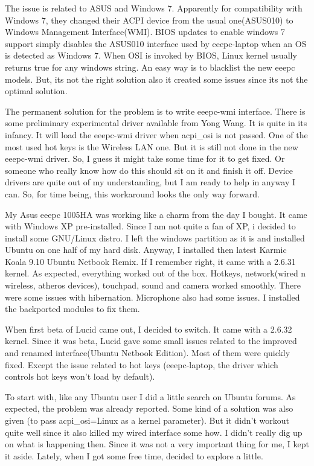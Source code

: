 The issue is related to ASUS and Windows 7. Apparently for compatibility 
with Windows 7, they changed their ACPI device from the usual one(ASUS010)
to Windows Management Interface(WMI). BIOS updates to enable windows 7 
support simply disables the ASUS010 interface used by eeepc-laptop when an 
OS is detected as Windows 7. When OSI is invoked by BIOS, Linux kernel usually
returns true for any windows string. An easy way is to blacklist the new eeepc
models. But, its not the right solution also it created some issues since its not the optimal solution.

The permanent solution for the problem is to write eeepc-wmi interface. There 
is some preliminary experimental driver available from Yong Wang. It is quite in
its infancy. It will load the eeepc-wmi driver when acpi\_osi is not passed.
One of the most used hot keys is the Wireless LAN one. But it is still not done in 
the new eeepc-wmi driver. So, I guess it might take some time for it to get fixed. Or someone 
who really know how do this should sit on it and finish it off. Device drivers are quite out
of my understanding, but I am ready to help in anyway I can. So, for time being, this workaround
looks the only way forward.

My Asus eeepc 1005HA was working like a charm from the day I bought. It came with Windows XP pre-installed. Since I am not quite a fan of XP, i decided to install some GNU/Linux distro. I left the windows partition as it is and installed Ubuntu on one half of my hard disk. Anyway, I installed then latest Karmic Koala 9.10 Ubuntu Netbook Remix. If I remember right, it came with a 2.6.31 kernel. As expected, everything worked out of the box. Hotkeys, network(wired n wireless, atheros devices), touchpad, sound and camera worked smoothly. There were some issues with hibernation. Microphone also had some issues. I installed the backported modules to fix them.

When first beta of Lucid came out, I decided to switch. It came with a 2.6.32 kernel. Since it was beta, Lucid gave some small issues related to the improved and renamed interface(Ubuntu Netbook Edition). Most of them were quickly fixed. Except the issue related to hot keys (eeepc-laptop, the driver which controls hot keys won’t load by default).

To start with, like any Ubuntu user I did a little search on Ubuntu forums. As expected, the problem was already reported. Some kind of a solution was also given (to pass acpi\_osi=Linux as a kernel parameter). But it didn’t workout quite well since it also killed my wired interface some how. I didn’t really dig up on what is happening then. Since it was not a very important thing for me, I kept it aside. Lately, when I got some free time, decided to explore a little.


